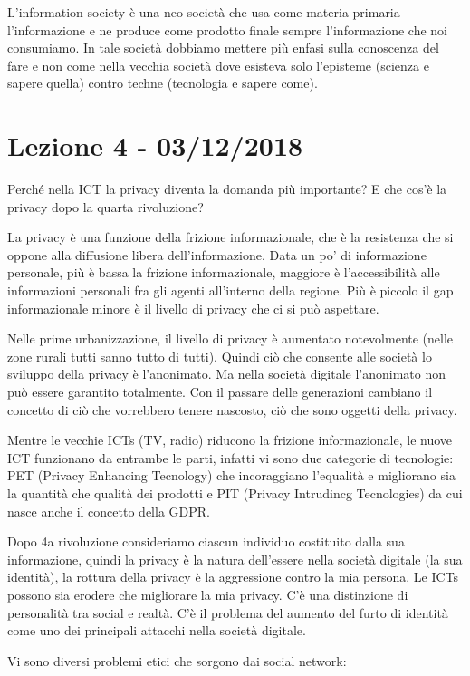 \documentclass[a4page, 11pt]{article}
\begin{document}
L'information society è una neo società che usa come materia primaria
l'informazione e ne produce come prodotto finale sempre l'informazione
che noi consumiamo. In tale società dobbiamo mettere più enfasi sulla
conoscenza del fare e non come nella vecchia società dove esisteva solo
l'episteme (scienza e sapere quella) contro techne (tecnologia e sapere
come).
\section*{Lezione 4 - 03/12/2018}

Perché nella ICT la privacy diventa la domanda più importante? E che
cos'è la privacy dopo la quarta rivoluzione?

La privacy è una funzione della frizione informazionale, che è la
resistenza che si oppone alla diffusione libera dell'informazione. Data
un po' di informazione personale, più è bassa la frizione
informazionale, maggiore è l'accessibilità alle informazioni personali
fra gli agenti all'interno della regione. Più è piccolo il gap
informazionale minore è il livello di privacy che ci si può aspettare.

Nelle prime urbanizzazione, il livello di privacy è aumentato
notevolmente (nelle zone rurali tutti sanno tutto di tutti). Quindi ciò
che consente alle società lo sviluppo della privacy è l'anonimato. Ma
nella società digitale l'anonimato non può essere garantito totalmente.
Con il passare delle generazioni cambiano il concetto di ciò che
vorrebbero tenere nascosto, ciò che sono oggetti della privacy.

Mentre le vecchie ICTs (TV, radio) riducono la frizione informazionale,
le nuove ICT funzionano da entrambe le parti, infatti vi sono due
categorie di tecnologie: PET (Privacy Enhancing Tecnology) che
incoraggiano l'equalità e migliorano sia la quantità che qualità dei
prodotti e PIT (Privacy Intrudincg Tecnologies) da cui nasce anche il
concetto della GDPR.

Dopo 4a rivoluzione consideriamo ciascun individuo costituito dalla sua
informazione, quindi la privacy è la natura dell'essere nella società
digitale (la sua identità), la rottura della privacy è la aggressione
contro la mia persona. Le ICTs possono sia erodere che migliorare la mia
privacy. C'è una distinzione di personalità tra social e realtà. C'è il
problema del aumento del furto di identità come uno dei principali
attacchi nella società digitale.

Vi sono diversi problemi etici che sorgono dai social network:
\end{document}
